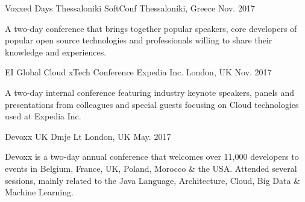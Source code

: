 

\begin{cventries}


  \cventry
    {Voxxed Days Thessaloniki} %
    {SoftConf} %
    {Thessaloniki, Greece} %
    {Nov. 2017} %
    {
      \begin{cvitems} %
        \item {A two-day conference that brings together popular speakers, core developers of popular open source technologies and professionals willing to share their knowledge and experiences.}
      \end{cvitems}
    }
    
   \cventry
    {EI Global Cloud xTech Conference} %
    {Expedia Inc.} %
    {London, UK} %
    {Nov. 2017} %
    {
      \begin{cvitems} %
        \item {A two-day internal conference featuring industry keynote speakers, panels and presentations from colleagues and special guests focusing on Cloud technologies used at Expedia Inc.}
      \end{cvitems}
    }

  \cventry
    {Devoxx UK} %
    {Dmje Lt} %
    {London, UK} %
    {May. 2017} %
    {
      \begin{cvitems} %
        \item {Devoxx is a two-day annual conference that welcomes over 11,000 developers to events in Belgium, France, UK, Poland, Morocco \& the USA. Attended several sessions, mainly related to the Java Language, Architecture,  Cloud, Big Data \& Machine Learning.}
      \end{cvitems}
    }


\end{cventries}
